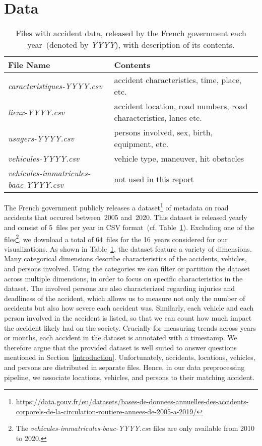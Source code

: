 \section{Data}
\label{data}
\begin{table}
    \caption{Files with accident data, released by the French government each year~(denoted by \textit{YYYY}), with description of its contents.}
    \label{table-files}
    \begin{tabularx}{\linewidth}{lX}
        \toprule
        \textbf{File Name} & \textbf{Contents} \\
        \midrule
        \textit{caracteristiques-YYYY.csv} & accident characteristics, time, place, etc. \\
        \textit{lieux-YYYY.csv} & accident location, road numbers, road characteristics, lanes etc. \\
        \textit{usagers-YYYY.csv} & persons involved, sex, birth, equipment, etc. \\
        \textit{vehicules-YYYY.csv} & vehicle type, maneuver, hit obstacles \\
        \textit{vehicules-immatricules-baac-YYYY.csv} & not used in this report \\
        \bottomrule
    \end{tabularx}
\end{table}
The French government publicly releases a dataset\footnote{\url{https://data.gouv.fr/en/datasets/bases-de-donnees-annuelles-des-accidents-corporels-de-la-circulation-routiere-annees-de-2005-a-2019/}} of  metadata on road accidents that occured between~2005 and~2020. This dataset is released yearly and consist of 5~files per year in CSV format~(cf. Table~\ref{table-files}). Excluding one of the files\footnote{The \textit{vehicules-immatricules-baac-YYYY.csv} files are only available from 2010 to 2020.}, we download a total of 64~files for the 16~years considered for our visualizations. As shown in  Table~\ref{table-files}, the dataset feature a variety of dimensions. Many categorical dimensions describe characteristics of the accidents, vehicles, and persons involved. Using the categories we can filter or partition the dataset across multiple dimensions, in order to focus on specific characteristics in the dataset. The involved persons are also characterized regarding injuries and deadliness of the accident, which allows us to measure not only the number of accidents but also how severe each accident was. Similarly, each vehicle and each person involved in the accident is listed, so that we can count how much impact the accident likely had on the society. Crucially for measuring trends across years or months, each accident in the dataset is annotated with a timestamp. We therefore argue that the provided dataset is well suited to answer questions mentioned in Section~\ref{introduction}. Unfortunately, accidents, locations, vehicles, and persons are distributed in separate files. Hence, in our data preprocessing pipeline, we associate locations, vehicles, and persons to their matching accident.

